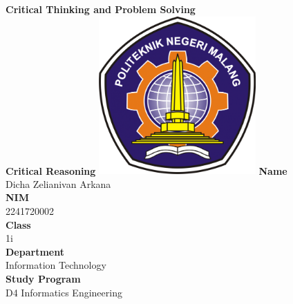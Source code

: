 \documentclass[12pt,titlepage]{article}
\newcommand{\vSubject}{Critical Thinking and Problem Solving}
\newcommand{\vSubtitle}{Critical Reasoning}
\newcommand{\vName}{Dicha Zelianivan Arkana}
\newcommand{\vNIM}{2241720002}
\newcommand{\vClass}{1i}
\newcommand{\vDepartment}{Information Technology}
\newcommand{\vStudyProgram}{D4 Informatics Engineering}
\begin{document}
\begin{titlepage}
    \centering
    \vfill
    {\bfseries\LARGE
        \vSubject\\
        \vskip0.25cm
        \vSubtitle
    }
    \vfill
    \includegraphics[width=6cm]{images/polinema-logo.png}
    \vfill
    {
        \textbf{Name}\\
        \vName\\
        \vskip0.5cm
        \textbf{NIM}\\
        \vNIM\\
        \vskip0.5cm
        \textbf{Class}\\
        \vClass\\
        \vskip0.5cm
        \textbf{Department}\\
        \vDepartment\\
        \vskip0.5cm
        \textbf{Study Program}\\
        \vStudyProgram
    }
\end{titlepage}
\end{document}
